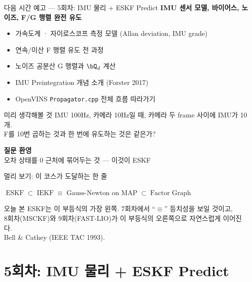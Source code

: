 \begin{frame}{다음 시간 예고 — 5회차: IMU 물리 + ESKF Predict}
  \textbf{IMU 센서 모델, 바이어스, 노이즈, F/G 행렬 완전 유도}
  \begin{itemize}
    \item 가속도계 · 자이로스코프 측정 모델 (Allan deviation, IMU grade)
    \item 연속/이산 F 행렬 유도 전 과정
    \item 노이즈 공분산 G 행렬과 $\bQ_d$ 계산
    \item IMU Preintegration 개념 소개 (Forster 2017)
    \item OpenVINS \texttt{Propagator.cpp} 전체 흐름 따라가기
  \end{itemize}
  \vspace{0.4em}
  \begin{block}{미리 생각해볼 것}
    IMU 100Hz, 카메라 10Hz일 때, 카메라 두 frame 사이에 IMU가 10개.\\
    F를 10번 곱하는 것과 한 번에 유도하는 것은 같은가?
  \end{block}
\end{frame}

\begin{frame}
  \vspace{1.0cm}
  \begin{center}
    {\Huge \textbf{질문 환영}}\\[0.6em]
    \large 오차 상태를 0 근처에 묶어두는 것 — 이것이 ESKF
  \end{center}
  \vspace{0.6em}
  \begin{exampleblock}{\small 멀리 보기: 이 코스가 도달하는 한 줄}
    \begin{center}
      $\boxed{\;\text{ESKF}\;\subset\;\text{IEKF}\;\equiv\;\text{Gauss-Newton on MAP}\;\subset\;\text{Factor Graph}\;}$
    \end{center}
    \scriptsize
    오늘 본 ESKF는 이 부등식의 가장 왼쪽. 7회차에서 ``$\equiv$'' 등치성을 보일 것이고,\\
    8회차(MSCKF)와 9회차(FAST-LIO)가 이 부등식의 오른쪽으로 자연스럽게 이어진다.\\
    Bell \& Cathey (IEEE TAC 1993).
  \end{exampleblock}
\end{frame}

\section{5회차: IMU 물리 + ESKF Predict}


